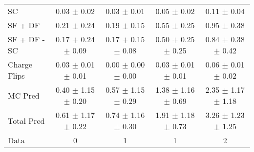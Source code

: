 \begin{tabular}{l|cccc}
                                 SC &  0.03 $\pm$  0.02 &  0.03 $\pm$  0.01 &  0.05 $\pm$  0.02 &  0.11 $\pm$  0.04 \\
                            SF + DF &  0.21 $\pm$  0.24 &  0.19 $\pm$  0.15 &  0.55 $\pm$  0.25 &  0.95 $\pm$  0.38 \\
\hline
                       SF + DF - SC &  0.17 $\pm$  0.24 $\pm$  0.09 &  0.17 $\pm$  0.15 $\pm$  0.08 &  0.50 $\pm$  0.25 $\pm$  0.25 &  0.84 $\pm$  0.38 $\pm$  0.42 \\
\hline\hline
                       Charge Flips &  0.03 $\pm$  0.01 $\pm$  0.01 &  0.00 $\pm$  0.00 $\pm$  0.00 &  0.03 $\pm$  0.01 $\pm$  0.01 &  0.06 $\pm$  0.01 $\pm$  0.02 \\
\hline
                            MC Pred &  0.40 $\pm$  1.15 $\pm$  0.20 &  0.57 $\pm$  1.15 $\pm$  0.29 &  1.38 $\pm$  1.16 $\pm$  0.69 &  2.35 $\pm$  1.17 $\pm$  1.18 \\
\hline
                         Total Pred &  0.61 $\pm$  1.17 $\pm$  0.22 &  0.74 $\pm$  1.16 $\pm$  0.30 &  1.91 $\pm$  1.18 $\pm$  0.73 &  3.26 $\pm$  1.23 $\pm$  1.25 \\
\hline\hline
                               Data &     0 &     1 &     1 &     2 \\
\hline\hline
\end{tabular}

